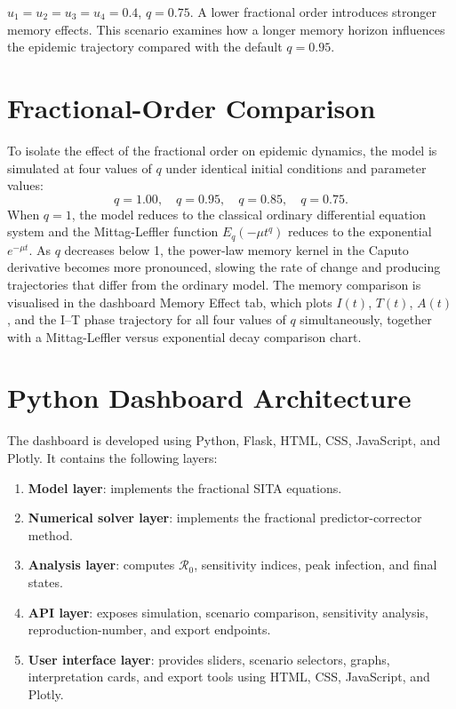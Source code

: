 \documentclass[12pt,a4paper,oneside]{report}
\newcommand{\Rzero}{\mathcal{R}_0}
\begin{document}
\begin{scenariobox}[title={Scenario 8 --- High Memory Effect ($q=0.75$)}]
$u_1=u_2=u_3=u_4=0.4$, $q=0.75$. A lower fractional order introduces stronger memory effects. This scenario examines how a longer memory horizon influences the epidemic trajectory compared with the default $q=0.95$.
\end{scenariobox}

\section{Fractional-Order Comparison}
To isolate the effect of the fractional order on epidemic dynamics, the model is simulated at four values of $q$ under identical initial conditions and parameter values:
\[
q=1.00,\quad q=0.95,\quad q=0.85,\quad q=0.75.
\]
When $q=1$, the model reduces to the classical ordinary differential equation system and the Mittag-Leffler function $E_q(-\mu t^q)$ reduces to the exponential $e^{-\mu t}$. As $q$ decreases below 1, the power-law memory kernel in the Caputo derivative becomes more pronounced, slowing the rate of change and producing trajectories that differ from the ordinary model. The memory comparison is visualised in the dashboard Memory Effect tab, which plots $I(t)$, $T(t)$, $A(t)$, and the I--T phase trajectory for all four values of $q$ simultaneously, together with a Mittag-Leffler versus exponential decay comparison chart.

\section{Python Dashboard Architecture}
The dashboard is developed using Python, Flask, HTML, CSS, JavaScript, and Plotly. It contains the following layers:
\begin{enumerate}
  \item \textbf{Model layer}: implements the fractional SITA equations.
  \item \textbf{Numerical solver layer}: implements the fractional predictor-corrector method.
  \item \textbf{Analysis layer}: computes $\Rzero$, sensitivity indices, peak infection, and final states.
  \item \textbf{API layer}: exposes simulation, scenario comparison, sensitivity analysis, reproduction-number, and export endpoints.
  \item \textbf{User interface layer}: provides sliders, scenario selectors, graphs, interpretation cards, and export tools using HTML, CSS, JavaScript, and Plotly.
\end{enumerate}
\end{document}
